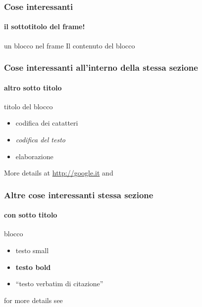 \begin{frame}
    \frametitle{Cose interessanti}
    \framesubtitle{il sottotitolo del frame!}
    \addtocounter{nframe}{1}
    
    \begin{block}{un blocco nel frame}
        Il contenuto del blocco
    \end{block}
    
\end{frame}

\begin{frame}
    \frametitle{Cose interessanti all'interno della stessa sezione}
    \framesubtitle{altro sotto titolo}
    \addtocounter{nframe}{1}
    
    \begin{block}{titolo del blocco}
        \begin{itemize}
            \item codifica dei catatteri
            \item \textit{codifica del testo}
            \item elaborazione
        \end{itemize}

        \begin{tiny}
            More details at \url{http://google.it} and \cite{ciotti2011}
        \end{tiny}

    \end{block}


\end{frame}

\begin{frame}
    \frametitle{Altre cose interessanti stessa sezione}
    \framesubtitle{con sotto titolo}
    \addtocounter{nframe}{1}
    
    \begin{block}{blocco}
        \begin{itemize}
            \item \begin{small} testo small \end{small}
            \item \textbf{testo bold}
            \item ``testo verbatim di citazione''
        \end{itemize}

        \begin{tiny}
            for more details see %
        \end{tiny}
    \end{block}


\end{frame}


